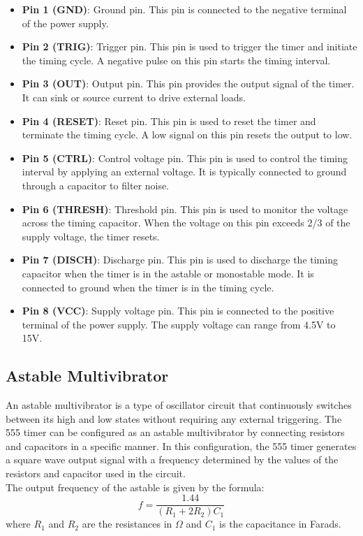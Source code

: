 \documentclass[12pt]{article}
\begin{document}
\begin{itemize}
    \item \textbf{Pin 1 (GND)}: Ground pin. This pin is connected to the negative terminal of the power supply.
    \item \textbf{Pin 2 (TRIG)}: Trigger pin. This pin is used to trigger the timer and initiate the timing cycle. A negative pulse on this pin starts the timing interval.
    \item \textbf{Pin 3 (OUT)}: Output pin. This pin provides the output signal of the timer. It can sink or source current to drive external loads.
    \item \textbf{Pin 4 (RESET)}: Reset pin. This pin is used to reset the timer and terminate the timing cycle. A low signal on this pin resets the output to low.
    \item \textbf{Pin 5 (CTRL)}: Control voltage pin. This pin is used to control the timing interval by applying an external voltage. It is typically connected to ground through a capacitor to filter noise.
    \item \textbf{Pin 6 (THRESH)}: Threshold pin. This pin is used to monitor the voltage across the timing capacitor. When the voltage on this pin exceeds 2/3 of the supply voltage, the timer resets.
    \item \textbf{Pin 7 (DISCH)}: Discharge pin. This pin is used to discharge the timing capacitor when the timer is in the astable or monostable mode. It is connected to ground when the timer is in the timing cycle.   
    \item \textbf{Pin 8 (VCC)}: Supply voltage pin. This pin is connected to the positive terminal of the power supply. The supply voltage can range from 4.5V to 15V.
\end{itemize} 

\subsection{Astable Multivibrator}
An astable multivibrator is a type of oscillator circuit that continuously switches between its high and low states without requiring any external triggering. The 555 timer can be configured as an astable multivibrator by connecting resistors and capacitors in a specific manner. In this configuration, the 555 timer generates a square wave output signal with a frequency determined by the values of the resistors and capacitor used in the circuit.\\
The output frequency of the astable is given by the formula:
\begin{equation}
    f = \frac{1.44}{(R_1 + 2R_2)C_1}
\end{equation}
where $R_1$ and $R_2$ are the resistances in $\Omega$ and $C_1$ is the capacitance in Farads.\\
\end{document}
